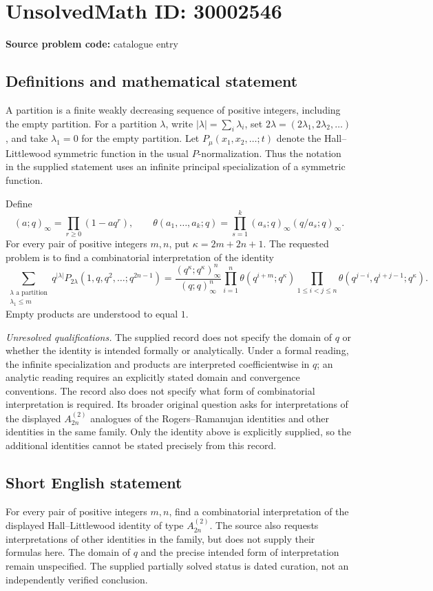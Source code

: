 \documentclass[11pt]{article}
\begin{document}
\section*{UnsolvedMath ID: 30002546}
\textbf{Source problem code:} catalogue entry
\subsection{Definitions and mathematical statement}
A partition is a finite weakly decreasing sequence of positive integers, including the empty partition. For a partition \(\lambda\), write \(|\lambda|=\sum_i\lambda_i\), set \(2\lambda=(2\lambda_1,2\lambda_2,\ldots)\), and take \(\lambda_1=0\) for the empty partition. Let \(P_\mu(x_1,x_2,\ldots;t)\) denote the Hall--Littlewood symmetric function in the usual \(P\)-normalization. Thus the notation in the supplied statement uses an infinite principal specialization of a symmetric function.

Define
\[
(a;q)_\infty=\prod_{r\geq0}(1-aq^r),\qquad
\theta(a_1,\ldots,a_k;q)=\prod_{s=1}^k(a_s;q)_\infty(q/a_s;q)_\infty.
\]
For every pair of positive integers \(m,n\), put \(\kappa=2m+2n+1\). The requested problem is to find a combinatorial interpretation of the identity
\[
\sum_{\substack{\lambda\text{ a partition}\\\lambda_1\leq m}}
q^{|\lambda|}P_{2\lambda}(1,q,q^2,\ldots;q^{2n-1})
=
\frac{(q^\kappa;q^\kappa)_\infty^n}{(q;q)_\infty^n}
\prod_{i=1}^n\theta(q^{i+m};q^\kappa)
\prod_{1\leq i<j\leq n}\theta(q^{j-i},q^{i+j-1};q^\kappa).
\]
Empty products are understood to equal \(1\).

\textit{Unresolved qualifications.} The supplied record does not specify the domain of \(q\) or whether the identity is intended formally or analytically. Under a formal reading, the infinite specialization and products are interpreted coefficientwise in \(q\); an analytic reading requires an explicitly stated domain and convergence conventions. The record also does not specify what form of combinatorial interpretation is required. Its broader original question asks for interpretations of the displayed \(A_{2n}^{(2)}\) analogues of the Rogers--Ramanujan identities and other identities in the same family. Only the identity above is explicitly supplied, so the additional identities cannot be stated precisely from this record.
\subsection{Short English statement}
For every pair of positive integers \(m,n\), find a combinatorial interpretation of the displayed Hall--Littlewood identity of type \(A_{2n}^{(2)}\). The source also requests interpretations of other identities in the family, but does not supply their formulas here. The domain of \(q\) and the precise intended form of interpretation remain unspecified. The supplied partially solved status is dated curation, not an independently verified conclusion.
\end{document}
